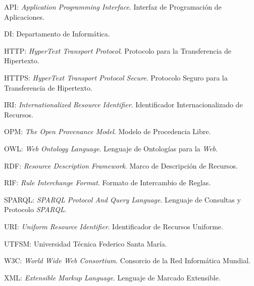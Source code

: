 
{\setlength{\parskip}{0cm} %

API: \textit{Application Programming Interface}. Interfaz de Programación de
Aplicaciones.

DI: Departamento de Informática.

HTTP: \textit{HyperText Transport Protocol}. Protocolo para la Transferencia de
Hipertexto.

HTTPS: \textit{HyperText Transport Protocol Secure}. Protocolo Seguro para la
Transferencia de Hipertexto.

IRI: \textit{Internationalized Resource Identifier}. Identificador
Internacionalizado de Recursos.

OPM: \textit{The Open Provenance Model}. Modelo de Procedencia Libre.

OWL: \textit{Web Ontology Language}. Lenguaje de Ontologías para la
\textit{Web}.

RDF: \textit{Resource Description Framework}. Marco de Descripción de Recursos.

RIF: \textit{Rule Interchange Format}. Formato de Intercambio de Reglas.

SPARQL: \textit{SPARQL Protocol And Query Language}. Lenguaje de Consultas y
Protocolo \textit{SPARQL}.

URI: \textit{Uniform Resource Identifier}. Identificador de Recursos Uniforme.

UTFSM: Universidad Técnica Federico Santa María.

W3C: \textit{World Wide Web Consortium}. Consorcio de la Red Informática
Mundial.

XML: \textit{Extensible Markup Language}. Lenguaje de Marcado Extensible.

}
